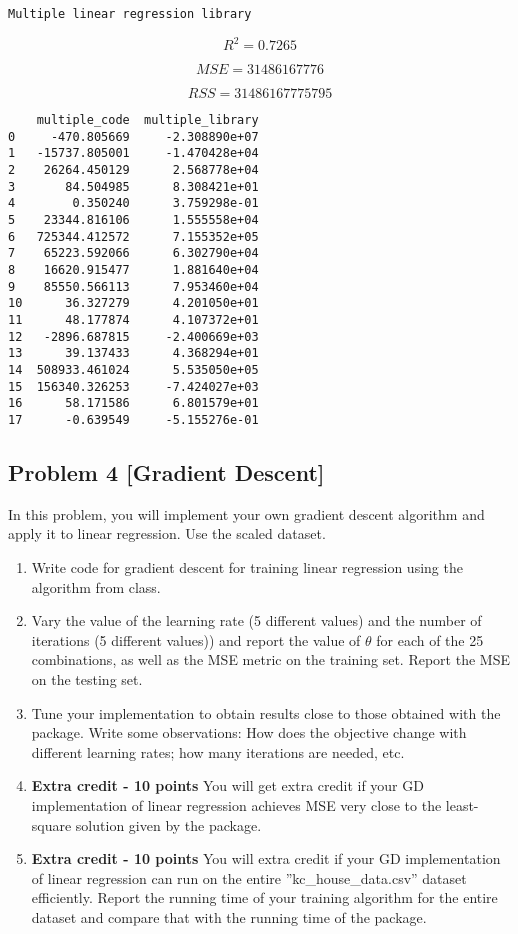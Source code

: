 \documentclass[11pt]{article}
\begin{document}
    
    \begin{Verbatim}[commandchars=\\\{\}]
Multiple linear regression library

    \end{Verbatim}

    $$R^2 = 0.7265$$

    
    $$MSE=31486167776$$

    
    $$RSS=31486167775795$$

    
    
    \begin{verbatim}
    multiple_code  multiple_library
0     -470.805669     -2.308890e+07
1   -15737.805001     -1.470428e+04
2    26264.450129      2.568778e+04
3       84.504985      8.308421e+01
4        0.350240      3.759298e-01
5    23344.816106      1.555558e+04
6   725344.412572      7.155352e+05
7    65223.592066      6.302790e+04
8    16620.915477      1.881640e+04
9    85550.566113      7.953460e+04
10      36.327279      4.201050e+01
11      48.177874      4.107372e+01
12   -2896.687815     -2.400669e+03
13      39.137433      4.368294e+01
14  508933.461024      5.535050e+05
15  156340.326253     -7.424027e+03
16      58.171586      6.801579e+01
17      -0.639549     -5.155276e-01
    \end{verbatim}

    
    \subsection{Problem 4 {[}Gradient
Descent{]}}\label{problem-4-gradient-descent}

In this problem, you will implement your own gradient descent algorithm
and apply it to linear regression. Use the scaled dataset.

\begin{enumerate}
\def\labelenumi{(\alph{enumi})}
\item
  Write code for gradient descent for training linear regression using
  the algorithm from class.
\item
  Vary the value of the learning rate (5 different values) and the
  number of iterations (5 different values)) and report the value of
  \(\theta\) for each of the 25 combinations, as well as the MSE metric
  on the training set. Report the MSE on the testing set.
\item
  Tune your implementation to obtain results close to those obtained
  with the package. Write some observations: How does the objective
  change with different learning rates; how many iterations are needed,
  etc.
\item
  \textbf{Extra credit - 10 points} You will get extra credit if your GD
  implementation of linear regression achieves MSE very close to the
  least-square solution given by the package.
\item
  \textbf{Extra credit - 10 points} You will extra credit if your GD
  implementation of linear regression can run on the entire
  ''kc\_house\_data.csv'' dataset efficiently. Report the running time
  of your training algorithm for the entire dataset and compare that
  with the running time of the package.
\end{enumerate}
\end{document}
